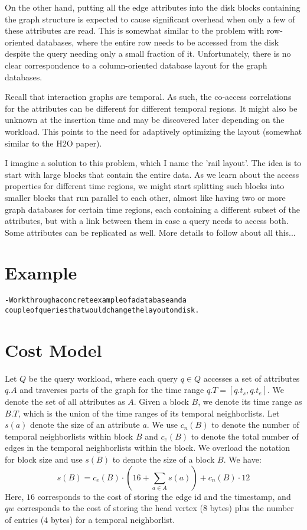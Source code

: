 \documentclass[twocolumn]{svjour3}          %
\begin{document}
On the other hand, putting all the edge attributes into the disk blocks
containing the graph structure is expected to cause significant overhead when
only a few of these attributes are read. This is somewhat similar to the 
problem with row-oriented databases, where the entire row needs to be accessed
from the disk despite the query needing only a small fraction of it.
Unfortunately, there is no clear correspondence to a column-oriented database
layout for the graph databases.
%

Recall that interaction graphs are temporal. As such, the co-access
correlations for the attributes can be different for different temporal
regions. It might also  be unknown at the insertion time and may be discovered
later depending on the workload. This points to the need for adaptively
optimizing the layout (somewhat similar to the H2O paper).
%

I imagine a solution to this problem, which I name the 'rail layout'. The idea
is to start with large blocks that contain the entire data. As we learn about
the access properties for different time regions, we might start splitting
such blocks into smaller blocks that run parallel to each other, almost like
having two or more graph databases for certain time regions, each containing a
 different subset of the attributes, but with a link between them in case a
query needs to access both. Some attributes can be replicated as well. 
More details to follow about all this...

\section{Example}

\begin{alltt}\scriptsize
- Work through a concrete example of a database and a 
   couple of queries that would change the layout on disk.
\end{alltt}




\section{Cost Model}
Let $Q$ be the query workload, where each query $q\in Q$ accesses a set of
attributes $q.A$ and traverses parts of the graph for the time range
$q.T=[q.t_s,q.t_e]$. We denote the set of all attributes as $A$. Given a block
$B$, we denote its time range as $B.T$, which is the union of the time ranges
of its temporal neighborlists. Let $s(a)$ denote the size of an attribute $a$.
We use $c_n(B)$ to denote the number of temporal neighborlists within block
$B$ and $c_e(B)$ to denote the total number of edges in the temporal
neighborlists within the block. We overload the notation for block size and
use $s(B)$ to denote the size of a block $B$. We have: 
\begin{equation}
s(B) = c_e(B) \cdot \left(16 + \sum_{a\in A} s(a)\right) + c_n(B) \cdot 12  
\end{equation}
Here, $16$ corresponds to the cost of storing the edge id and the timestamp,
and $qw$ corresponds to the cost of storing the head vertex ($8$ bytes) plus
the number of entries ($4$ bytes) for a temporal neighborlist. 
\end{document}
